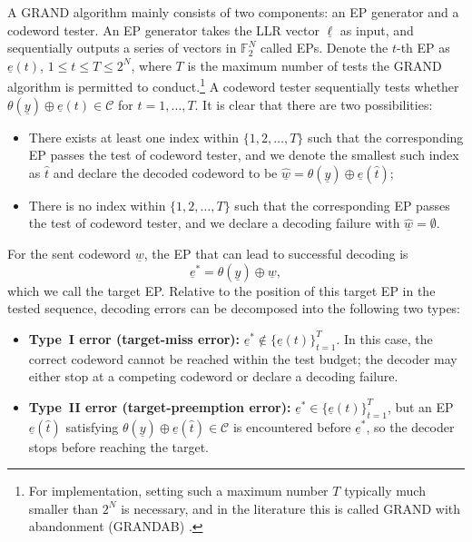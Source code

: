 \documentclass[letterpaper,draftclsnofoot,onecolumn]{IEEEtran}
\begin{document}
A GRAND algorithm mainly consists of two components: an EP generator and a codeword tester. An EP generator takes the LLR vector $\underline{\ell}$ as input, and sequentially outputs a series of vectors in $\mathbb{F}_2^N$ called EPs. Denote the $t$-th EP as $\underline{e}(t)$, $1 \leq t \leq T \leq 2^N$, where $T$ is the maximum number of tests the GRAND algorithm is permitted to conduct.\footnote{For implementation, setting such a maximum number $T$ typically much smaller than $2^N$ is necessary, and in the literature this is called GRAND with abandonment (GRANDAB) \cite{duffy2019GRAND}.} A codeword tester sequentially tests whether $\theta(\underline{y}) \oplus \underline{e}(t) \in \mathcal{C}$ for $t=1,\ldots,T$. It is clear that there are two possibilities:
\begin{itemize}
    \item There exists at least one index within $\{1, 2, \ldots, T\}$ such that the corresponding EP passes the test of codeword tester, and we denote the smallest such index as $\hat{t}$ and declare the decoded codeword to be $\hat{\underline{w}} = \theta(\underline{y}) \oplus \underline{e}(\hat{t})$;
    \item There is no index within $\{1, 2, \ldots, T\}$ such that the corresponding EP passes the test of codeword tester, and we declare a decoding failure with $\hat{\underline{w}} = \emptyset$.
\end{itemize}

For the sent codeword $\underline{w}$, the EP that can lead to successful decoding is
\begin{equation}\label{eqn:target-error-pattern}
    \underline{e}^{*} = \theta(\underline{y}) \oplus \underline{w},
\end{equation}
which we call the target EP. Relative to the position of this target EP in the tested sequence, decoding errors can be decomposed into the following two types:
\begin{itemize}
    \item \textbf{Type~I error (target-miss error):} $\underline{e}^{*} \notin \{\underline{e}(t)\}_{t=1}^{T}$. In this case, the correct codeword cannot be reached within the test budget; the decoder may either stop at a competing codeword or declare a decoding failure.
    \item \textbf{Type~II error (target-preemption error):} $\underline{e}^{*} \in \{\underline{e}(t)\}_{t=1}^{T}$, but an EP $\underline{e}(\hat t)$ satisfying $\theta(\underline{y})\oplus\underline{e}(\hat{t})\in\mathcal{C}$ is encountered before $\underline{e}^{*}$, so the decoder stops before reaching the target.
\end{itemize}
\end{document}
